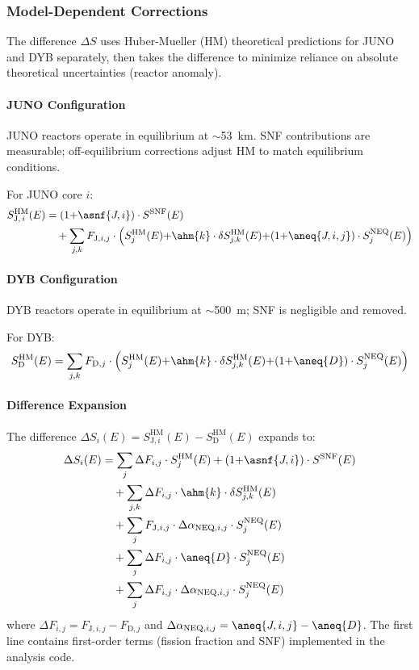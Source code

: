 \subsubsection{Model-Dependent Corrections}

The difference $\Delta S$ uses Huber-Mueller (HM) theoretical predictions for JUNO and DYB separately,
then takes the difference to minimize reliance on absolute theoretical uncertainties (reactor anomaly).

\paragraph{JUNO Configuration}
JUNO reactors operate in equilibrium at $\sim$53~km. SNF contributions are measurable;
off-equilibrium corrections adjust HM to match equilibrium conditions.

For JUNO core $i$:
{\small
\begin{align}
  S_{\text{J},\, i}^{\text{HM}}(E) &= (1{+}\asnf{J,i}) \cdot S^{\text{SNF}}(E) \notag \\
   &\quad + \sum_{j,k} F_{\text{J},i,j} \cdot \left(S^{\text{HM}}_j(E) {+}\ahm{k} \cdot\delta S^{\text{HM}}_{j,k}(E) {+}(1{+}\aneq{J,i,j}) \cdot S_j^{\text{NEQ}}(E)\right)
\end{align}
}

\paragraph{DYB Configuration}
DYB reactors operate in equilibrium at $\sim$500~m; SNF is negligible and removed.

For DYB:
{\small
\begin{equation}
  S_{\text{D}}^{\text{HM}}(E) = \sum_{j,k} F_{\text{D},j} \cdot \left(S^{\text{HM}}_j(E) {+} \ahm{k} \cdot\delta S^{\text{HM}}_{j,k}(E) {+} (1{+}\aneq{D}) \cdot S_j^{\text{NEQ}}(E)\right)
\end{equation}
}

\paragraph{Difference Expansion}
The difference $\Delta S_i(E) = S_{\text{J},i}^{\text{HM}}(E) - S_{\text{D}}^{\text{HM}}(E)$ expands to:
{\small
\begin{align}
  \Delta S_i(E) & = \sum_{j} \Delta F_{i,j} \cdot S^{\text{HM}}_j(E) + (1{+}\asnf{J,i}) \cdot S^{\text{SNF}}(E) \notag \\
   & \quad + \sum_{j,k} \Delta F_{i,j} \cdot \ahm{k} \cdot \delta S^{\text{HM}}_{j,k}(E) \notag \\
   & \quad + \sum_{j} F_{\text{J},i,j} \cdot \Delta \alpha_{\text{NEQ},i,j} \cdot S_j^{\text{NEQ}}(E) \notag \\
   & \quad + \sum_{j} \Delta F_{i,j} \cdot \aneq{D} \cdot S_j^{\text{NEQ}}(E) \notag \\
   & \quad + \sum_{j} \Delta F_{i,j} \cdot \Delta \alpha_{\text{NEQ},i,j} \cdot S_j^{\text{NEQ}}(E)
\end{align}
}
where $\Delta F_{i,j} = F_{\text{J},i,j} - F_{\text{D},j}$ and $\Delta\alpha_{\text{NEQ},i,j} = \aneq{J,i,j} - \aneq{D}$.
The first line contains first-order terms (fission fraction and SNF) implemented in the analysis code.

